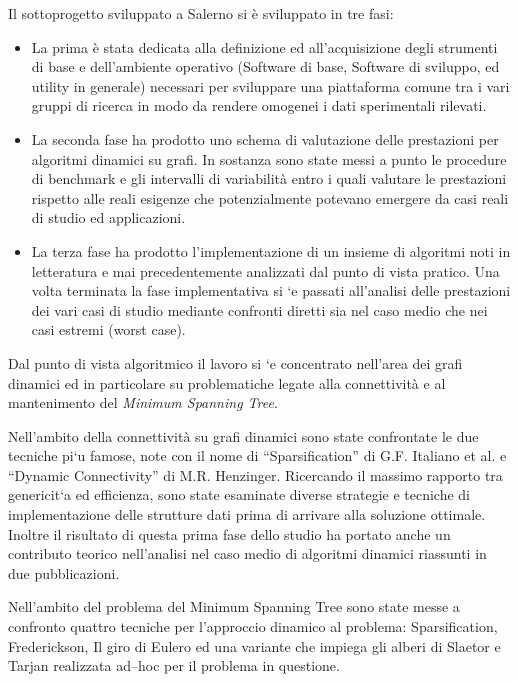 \documentclass[11pt]{article}
\begin{document}
Il sottoprogetto sviluppato a Salerno si \`e sviluppato in tre fasi:
\begin{itemize}
\item La prima \`e stata dedicata alla definizione ed all'acquisizione
degli strumenti di base e dell'ambiente operativo (Software di base,
Software di sviluppo, ed utility in generale) necessari per sviluppare
una piattaforma comune tra i vari gruppi di ricerca in modo da rendere
omogenei i dati sperimentali rilevati.

\item La seconda fase ha prodotto uno schema di valutazione delle
  prestazioni per algoritmi dinamici su grafi. In sostanza sono state
  messi a punto le procedure di benchmark e gli intervalli di
  variabilit\`a entro i quali valutare le prestazioni rispetto alle
  reali  esigenze che potenzialmente potevano emergere da casi reali di
  studio  ed applicazioni.

\item La terza fase ha prodotto l'implementazione di un insieme di algoritmi
  noti in letteratura e mai precedentemente analizzati dal
  punto di vista pratico. Una volta terminata la fase implementativa
  si \a`e passati all'analisi delle prestazioni dei vari casi di studio
  mediante  confronti diretti sia nel caso medio che nei casi estremi
  (worst case). 
\end{itemize}

Dal punto di vista algoritmico il lavoro si \a`e concentrato nell'area
dei  grafi dinamici ed in particolare su problematiche legate alla
connettivit\`a e al mantenimento del {\sl Minimum Spanning Tree}.

Nell'ambito della connettivit\`a su grafi dinamici sono state
confrontate le due tecniche pi\a`u famose, note con il nome di
``Sparsification'' di G.F. Italiano et al. e ``Dynamic Connectivity''
di M.R.  Henzinger.  Ricercando il massimo rapporto tra genericit\a`a
ed efficienza, sono state esaminate diverse strategie e tecniche di
implementazione delle strutture dati prima di arrivare alla soluzione
ottimale.  Inoltre il risultato di questa prima fase dello studio ha
portato anche un contributo teorico nell'analisi nel caso medio di
algoritmi dinamici riassunti in due pubblicazioni\cite{SODA96:1,jea:1}.

Nell'ambito del problema del Minimum Spanning Tree sono state messe a
confronto quattro tecniche per l'approccio dinamico al problema:
Sparsification, Frederickson, Il giro di Eulero ed una variante che
impiega gli alberi di Slaetor e Tarjan realizzata ad--hoc per il
problema in questione.
\end{document}
